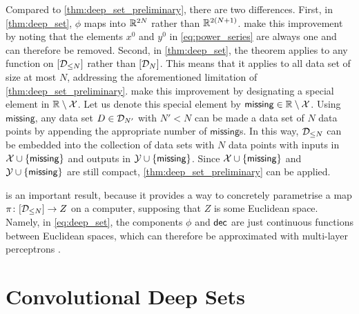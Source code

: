 \documentclass[12pt, twoside]{report}
\begin{document}
Compared to \cref{thm:deep_set_preliminary}, there are two differences.
First, in \cref{thm:deep_set}, $\phi$ maps into $\mathbb{R}^{2N}$ rather than $\mathbb{R}^{2(N+1)}$.
\citeauthor{Wagstaff:2019:On_the_Limitations_of_Representing} make this improvement by noting that the elements $x^0$ and $y^0$ in \eqref{eq:power_series} are always one and can therefore be removed.
Second, in \cref{thm:deep_set}, the theorem applies to any function on $[\mathcal{D}_{\le N}]$ rather than $[\mathcal{D}_{N}]$.
This means that it applies to all data set of size at most $N$, addressing the aforementioned limitation of \cref{thm:deep_set_preliminary}.
\citeauthor{Wagstaff:2019:On_the_Limitations_of_Representing} make this improvement by designating a special element in $\mathbb{R} \setminus \mathcal{X}$.
Let us denote this special element by $\mathsf{missing} \in \mathbb{R} \setminus \mathcal{X}$.
Using $\mathsf{missing}$, any data set $D \in \mathcal{D}_{N'}$ with $N' < N$ can be made a data set of $N$ data points by appending the appropriate number of $\mathsf{missing}$s.
In this way, $\mathcal{D}_{\le N}$ can be embedded into the collection of data sets with $N$ data points with inputs in
$\mathcal{X} \cup \{\mathsf{missing}\}$ and outputs in $\mathcal{Y} \cup \{\mathsf{missing}\}$.
Since $\mathcal{X} \cup \{\mathsf{missing}\}$ and $\mathcal{Y} \cup \{\mathsf{missing}\}$ are still compact, \cref{thm:deep_set_preliminary} can be applied.

 is an important result, because it provides a way to concretely parametrise a map $\pi\colon[\mathcal{D}_{\le N}] \to Z$ on a computer, supposing that $Z$ is some Euclidean space. 
Namely, in \eqref{eq:deep_set}, the components $\phi$ and $\mathsf{dec}$ are just continuous functions between Euclidean spaces, which can therefore be approximated with multi-layer perceptrons \parencite{Cybenko:1989:Approximation_by_Superpositions_of_a}.

\section{Convolutional Deep Sets}
\label{sec:repr_theorems:conv_deep_sets}
\end{document}
